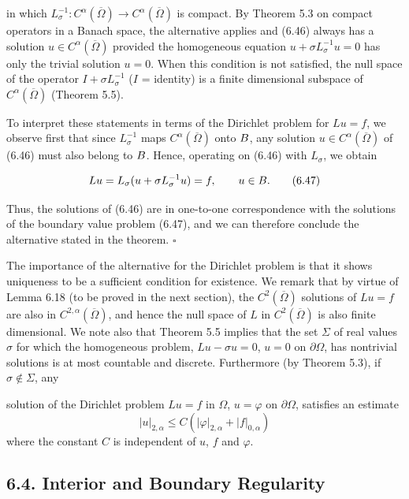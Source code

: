 in which $L_\sigma^{-1} : C^\alpha(\overline{\Omega}) \to C^\alpha(\overline{\Omega})$ is compact. By Theorem 5.3 on compact operators in a Banach space, the alternative applies and (6.46) always has a solution $u \in C^\alpha(\overline{\Omega})$ provided the homogeneous equation $u + \sigma L_\sigma^{-1}u = 0$ has only the trivial solution $u = 0$. When this condition is not satisfied, the null space of the operator $I + \sigma L_\sigma^{-1}$ ($I$ = identity) is a finite dimensional subspace of $C^\alpha(\overline{\Omega})$ (Theorem 5.5).

To interpret these statements in terms of the Dirichlet problem for $Lu = f$, we observe first that since $L_\sigma^{-1}$ maps $C^\alpha(\overline{\Omega})$ onto $B$, any solution $u \in C^\alpha(\overline{\Omega})$ of (6.46) must also belong to $B$. Hence, operating on (6.46) with $L_\sigma$, we obtain

\begin{equation}
Lu = L_\sigma(u + \sigma L_\sigma^{-1}u) = f, \qquad u \in B.
\tag{6.47}
\end{equation}

Thus, the solutions of (6.46) are in one-to-one correspondence with the solutions of the boundary value problem (6.47), and we can therefore conclude the alternative stated in the theorem. $\square$

The importance of the alternative for the Dirichlet problem is that it shows uniqueness to be a sufficient condition for existence. We remark that by virtue of Lemma 6.18 (to be proved in the next section), the $C^{2}(\overline{\Omega})$ solutions of $Lu = f$ are also in $C^{2,\alpha}(\overline{\Omega})$, and hence the null space of $L$ in $C^{2}(\overline{\Omega})$ is also finite dimensional.
We note also that Theorem 5.5 implies that the set $\Sigma$ of real values $\sigma$ for which the homogeneous problem, $Lu - \sigma u = 0$, $u = 0$ on $\partial\Omega$, has nontrivial solutions is at most countable and discrete. Furthermore (by Theorem 5.3), if $\sigma \notin \Sigma$, any


solution of the Dirichlet problem $Lu=f$ in $\Omega$, $u=\varphi$ on $\partial\Omega$, satisfies an estimate
\[
|u|_{2,\alpha}\leq C(|\varphi|_{2,\alpha}+|f|_{0,\alpha})
\]
where the constant $C$ is independent of $u$, $f$ and $\varphi$.

\subsection*{6.4. Interior and Boundary Regularity}

